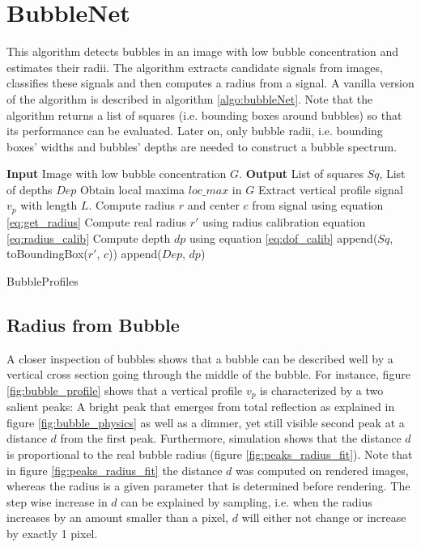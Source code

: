 		
		
		
	\section{BubbleNet}\label{BubbleNet}
	
	This algorithm detects bubbles in an image with low bubble concentration and estimates their radii. The algorithm extracts candidate signals from images, classifies these signals and then computes a radius from a signal. A vanilla version of the algorithm is described in algorithm \ref{algo:bubbleNet}. Note that the algorithm returns a list of squares (i.e. bounding boxes around bubbles) so that its performance can be evaluated. Later on, only bubble radii, i.e. bounding boxes' widths and bubbles' depths are needed to construct a bubble spectrum. 
	
			\begin{algorithm}
			\begin{algorithmic}[1]
				\State \textbf{Input} Image with low bubble concentration $G$. 
				\State \textbf{Output} List of squares $Sq$, List of depths $Dep$
				\State Obtain local maxima $loc\_max$ in $G$
					\State Extract vertical profile signal $v_p$ with length $L$.
						\State Compute radius $r$ and center $c$ from signal using equation \ref{eq:get_radius}
						\State Compute real radius $r'$ using radius calibration equation \ref{eq:radius_calib}
						\State Compute depth $dp$ using equation \ref{eq:dof_calib}
						\State append($Sq$, toBoundingBox($r'$, $c$))
						\State append($Dep$, $dp$)
					\EndIf
				\EndFor
			\end{algorithmic}
			
			\caption{BubbleProfiles}
			\label{algo:bubbleNet}
		\end{algorithm}
	
	\subsection{Radius from Bubble}
	
	A closer inspection of bubbles shows that a bubble can be described well by a vertical cross section going through the middle of the bubble. For instance, figure \ref{fig:bubble_profile} shows that a vertical profile $v_p$ is characterized by a two salient peaks: A bright peak that emerges from total reflection as explained in figure \ref{fig:bubble_physics} as well as a dimmer, yet still visible second peak at a distance $d$ from the first peak. Furthermore, simulation shows that the distance $d$ is proportional to the real bubble radius (figure \ref{fig:peaks_radius_fit}). Note that in figure \ref{fig:peaks_radius_fit} the distance $d$ was computed on rendered images, whereas the radius is a given parameter that is determined before rendering. The step wise increase in $d$ can be explained by sampling, i.e. when the radius increases by an amount smaller than a pixel, $d$ will either not change or increase by exactly 1 pixel.
	
